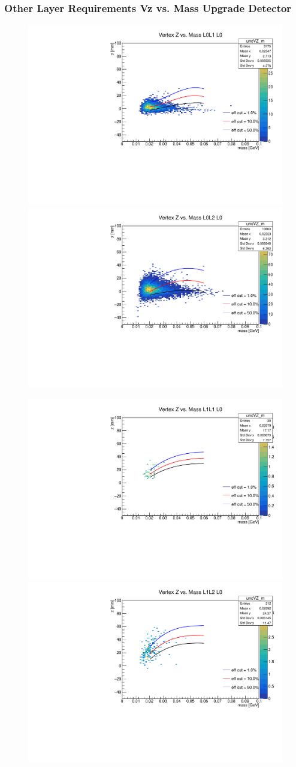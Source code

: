 \documentclass{beamer}
\begin{document}
\begin{frame}
\frametitle{Other Layer Requirements Vz vs. Mass Upgrade Detector}
\begin{figure}
\includegraphics[width=0.4\linewidth]{figs/L0L1_loose.pdf}
\includegraphics[width=0.4\linewidth]{figs/L0L2_loose.pdf}
\end{figure}
\begin{figure}
\includegraphics[width=0.4\linewidth]{figs/L1L1_loose.pdf}
\includegraphics[width=0.4\linewidth]{figs/L1L2_loose.pdf}
\end{figure}

\end{frame}

\end{document}
